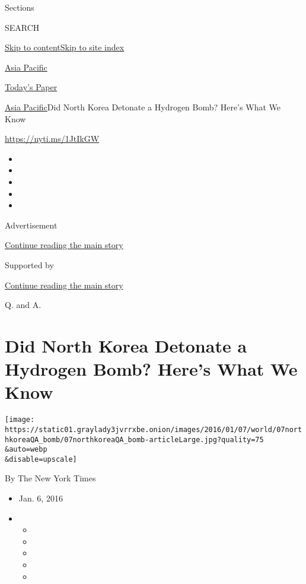Sections

SEARCH

\protect\hyperlink{site-content}{Skip to
content}\protect\hyperlink{site-index}{Skip to site index}

\href{https://www.nytimes3xbfgragh.onion/section/world/asia}{Asia
Pacific}

\href{https://myaccount.nytimes3xbfgragh.onion/auth/login?response_type=cookie\&client_id=vi}{}

\href{https://www.nytimes3xbfgragh.onion/section/todayspaper}{Today's
Paper}

\href{/section/world/asia}{Asia Pacific}\textbar{}Did North Korea
Detonate a Hydrogen Bomb? Here's What We Know

\url{https://nyti.ms/1JtIkGW}

\begin{itemize}
\item
\item
\item
\item
\item
\end{itemize}

Advertisement

\protect\hyperlink{after-top}{Continue reading the main story}

Supported by

\protect\hyperlink{after-sponsor}{Continue reading the main story}

Q. and A.

\hypertarget{did-north-korea-detonate-a-hydrogen-bomb-heres-what-we-know}{%
\section{Did North Korea Detonate a Hydrogen Bomb? Here's What We
Know}\label{did-north-korea-detonate-a-hydrogen-bomb-heres-what-we-know}}

\texttt{[image: https://static01.graylady3jvrrxbe.onion/images/2016/01/07/world/07northkoreaQA\_bomb/07northkoreaQA\_bomb-articleLarge.jpg?quality=75\\\&auto=webp\\\&disable=upscale]}

By The New York Times

\begin{itemize}
\item
  Jan. 6, 2016
\item
  \begin{itemize}
  \item
  \item
  \item
  \item
  \item
  \end{itemize}
\end{itemize}

